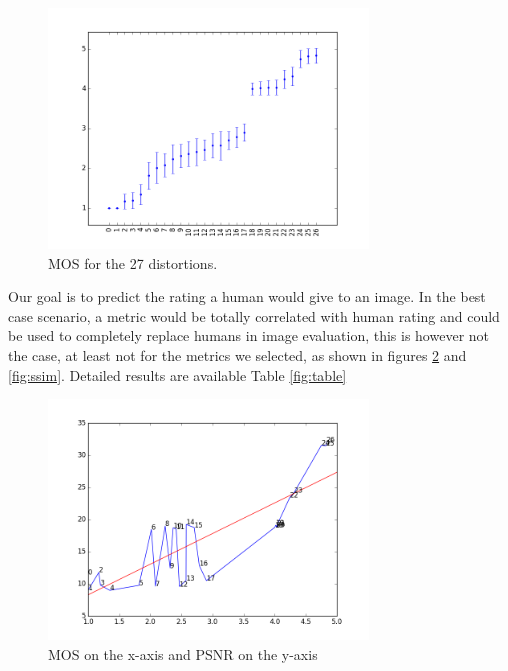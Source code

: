 \documentclass{article}
\begin{document}
\begin{figure}[ht]
  \centering
  \includegraphics[width=8.5cm]{figures/mos}
  \vspace{-5mm}
  \caption{MOS for the 27 distortions.\label{fig:mos} }
\end{figure}

Our goal is to predict the rating a human would give to an image. In the best case scenario, a metric would be totally correlated with human rating and could be used to completely replace humans in image evaluation, this is however not the case, at least not for the metrics we selected, as shown in figures \ref{fig:psnr} and \ref{fig:ssim}. Detailed results are available Table \ref{fig:table}

\begin{figure}[ht]
  \centering
  \includegraphics[width=8.5cm]{figures/mos_psnr}
  \vspace{-5mm}
  \caption{MOS on the x-axis and PSNR on the y-axis\label{fig:psnr} }
\end{figure}
\end{document}
